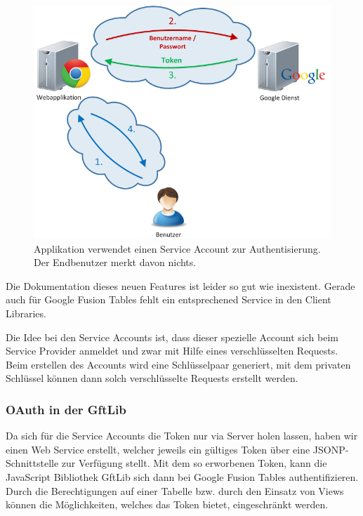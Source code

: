 \begin{figure}[!ht]
	\centering
	\includegraphics[width=\textwidth]{images/oauth/oauth-serviceaccount}
	\caption{Applikation verwendet einen Service Account zur Authentisierung. Der Endbenutzer merkt davon nichts.}
	\label{oauth-serviceaccount}
\end{figure}

Die Dokumentation dieses neuen Features ist leider so gut wie inexistent. Gerade auch für Google Fusion Tables fehlt ein entsprechened Service in den Client Libraries.

Die Idee bei den Service Accounts ist, dass dieser spezielle Account sich beim Service Provider anmeldet und zwar mit Hilfe eines verschlüsselten Requests. Beim erstellen des Accounts wird eine Schlüsselpaar generiert, mit dem privaten Schlüssel können dann solch verschlüsselte Requests erstellt werden.

\subsubsection{OAuth in der GftLib}
Da sich für die Service Accounts die Token nur via Server holen lassen, haben wir einen Web Service erstellt, welcher jeweils ein gültiges Token über eine \gls{JSONP}-Schnittstelle zur Verfügung stellt. Mit dem so erworbenen Token, kann die JavaScript Bibliothek GftLib sich dann bei Google Fusion Tables authentifizieren. Durch die Berechtigungen auf einer Tabelle bzw. durch den Einsatz von Views können die Möglichkeiten, welches das Token bietet, eingeschränkt werden.






